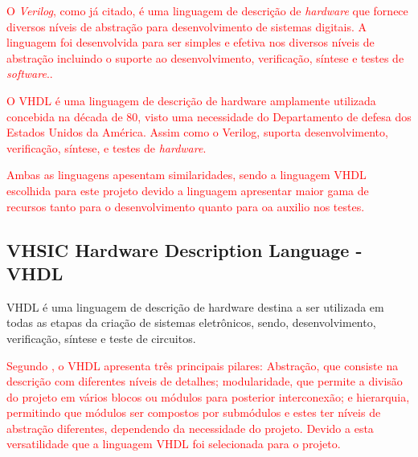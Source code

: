 \par
\textcolor{red}{O \textit{Verilog}, como já citado, é uma linguagem de descrição de \textit{hardware} que fornece diversos níveis de abstração para desenvolvimento de sistemas digitais\cite{thomas2008verilog}. A linguagem foi desenvolvida para ser simples e efetiva nos diversos níveis de abstração incluindo o suporte ao desenvolvimento, verificação, síntese e testes de \textit{software}.\cite{IEEEVerilogLanguage}.}

\par
\textcolor{red}{O VHDL é uma linguagem de descrição de hardware amplamente utilizada concebida na década de 80, visto uma necessidade do Departamento de defesa dos Estados Unidos da América\cite{cappelattipraticando}. Assim como o Verilog, suporta desenvolvimento, verificação, síntese, e testes de \textit{hardware}\cite{IEEEVHDLLanguage}.}

\par
\textcolor{red}{Ambas as linguagens apesentam similaridades, sendo a linguagem VHDL escolhida para este projeto devido a linguagem apresentar maior gama de recursos tanto para o desenvolvimento quanto para oa auxilio nos testes.}

\subsection{VHSIC Hardware Description Language - VHDL}

VHDL é uma linguagem de descrição de hardware destina a ser utilizada em todas as etapas da criação de sistemas eletrônicos, sendo, desenvolvimento, verificação, síntese e teste de circuitos\cite{IEEEVHDLLanguage}.

\par
\textcolor{red}{Segundo \cite{cappelattipraticando}, o VHDL apresenta três principais pilares: Abstração, que consiste na descrição com diferentes níveis de detalhes; modularidade, que permite a divisão do projeto em vários blocos ou módulos para posterior interconexão; e hierarquia, permitindo que módulos ser compostos por submódulos e estes ter níveis de abstração diferentes, dependendo da necessidade do projeto. Devido a esta versatilidade que a linguagem VHDL foi selecionada para o projeto.}

